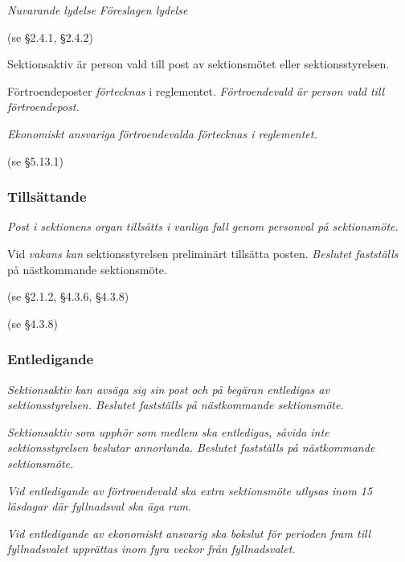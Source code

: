 \documentclass{article}
\newenvironment{lydelse}
    {\begin{paracol}{2}%
        \emph{Nuvarande lydelse}%
        \switchcolumn%
        \emph{Föreslagen lydelse}%
    \end{paracol}%
    \begin{enumerate}[label=\thesubsection.\arabic*]%
    \begin{paracol}{2}%
    }{\end{paracol}\end{enumerate}}
\begin{document}
\begin{lydelse}
    (se \S 2.4.1, \S 2.4.2)
  
  \switchcolumn
    \item Sektionsaktiv är person vald till post av sektionsmötet eller
      sektionsstyrelsen.
      \label{4.x:aktiv}
  
    \item Förtroendeposter \emph{förtecknas} i reglementet.
      \emph{Förtroendevald är person vald till förtroendepost.}
      \label{4.x:fortroende}

    \item \emph{Ekonomiskt ansvariga förtroendevalda förtecknas i reglementet.}

  \switchcolumn*
    (se \S 5.13.1)
  \switchcolumn
    \subsubsection*{Tillsättande}
    \item \emph{Post i sektionens organ tillsätts i vanliga fall genom personval
        på sektionsmöte.}

    \item Vid \emph{vakans kan} sektionsstyrelsen preliminärt tillsätta
      posten. \emph{Beslutet fastställs} på nästkommande sektionsmöte.

  \switchcolumn*
    \item[] (se \S 2.1.2, \S 4.3.6, \S 4.3.8)
    \item[] (se \S 4.3.8)
  
  \switchcolumn
    \subsubsection*{Entledigande}
    \item \emph{Sektionsaktiv kan avsäga sig sin post och på begäran entledigas av
      sektionsstyrelsen. Beslutet fastställs på nästkommande sektionsmöte.}

    \item \emph{Sektionsaktiv som upphör som medlem ska entledigas, såvida inte
      sektionsstyrelsen beslutar annorlunda. Beslutet fastställs på
      nästkommande sektionsmöte.}
      \label{4.x:kvarstå}

    \item \emph{Vid entledigande av förtroendevald ska extra sektionsmöte utlysas inom
      15 läsdagar där fyllnadsval ska äga rum}.

    \item \emph{Vid entledigande av ekonomiskt ansvarig ska bokslut för perioden
      fram till fyllnadsvalet upprättas inom fyra veckor från fyllnadsvalet.}
      \label{4.2:enteko}
    
\end{lydelse}
\end{document}

